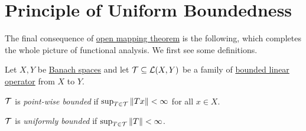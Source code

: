 \section{Principle of Uniform Boundedness}
The final consequence of \hyperref[thm:open-mapping]{open mapping theorem} is the following, which completes the whole picture of functional analysis. We first see some definitions.

\begin{definition*}
	Let \(X, Y\) be \hyperref[def:Banach-space]{Banach spaces} and let \(\mathcal{\MakeUppercase{T}} \subseteq \mathcal{\MakeUppercase{l}} (X, Y)\) be a family of \hyperref[def:bounded-linear-op]{bounded linear operator} from \(X\) to \(Y\).
	\begin{definition}\label{def:point-wise-bounded}
		\(\mathcal{\MakeUppercase{t}} \) is \emph{point-wise bounded} if \(\sup _{T\in \mathcal{\MakeUppercase{t}} } \left\lVert Tx\right\rVert < \infty\) for all \(x\in X\).
	\end{definition}
	\begin{definition}\label{def:uniformly-bounded}
		\(\mathcal{\MakeUppercase{t}} \) is \emph{uniformly bounded} if \(\sup _{T\in \mathcal{\MakeUppercase{t}} }\left\lVert T\right\rVert < \infty \).
	\end{definition}
\end{definition*}

